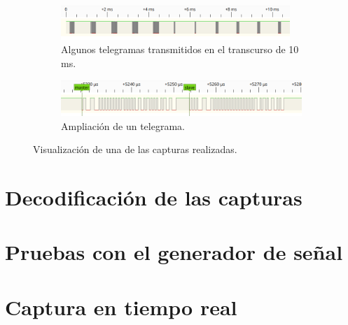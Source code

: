 \begin{figure}[htbp!]
	\centering
    \begin{subfigure}[b]{0.95\textwidth}
        \centering
        \includegraphics[width=0.95\textwidth]{./Figures/pulseview-10ms.png}
        \caption{Algunos telegramas transmitidos en el transcurso de 10 ms.}
        \label{fig:pulseview-10ms}
    \end{subfigure}
    \par\bigskip
    \begin{subfigure}[b]{0.95\textwidth}
        \centering
        \includegraphics[width=1\textwidth]{./Figures/pulseview-telegrama.png}
        \caption{Ampliación de un telegrama.}
        \label{fig:pulseview-telegrama}
    \end{subfigure}
    \caption{Visualización de una de las capturas realizadas.}
    \label{fig:pulseview}
\end{figure}

\section{Decodificación de las capturas}
\label{sec:decodificacion}

\section{Pruebas con el generador de señal}
\section{Captura en tiempo real}
